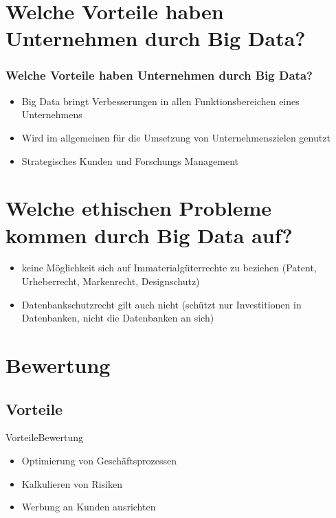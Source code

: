 \documentclass[10pt,a4paper]{beamer}
\begin{document}
\section{Welche Vorteile haben Unternehmen durch Big Data?}
\begin{frame}
\frametitle{Welche Vorteile haben Unternehmen durch Big Data?}
\begin{itemize}
	\item Big Data bringt Verbesserungen in allen Funktionsbereichen eines Unternehmens \pause
	\item Wird im allgemeinen für die Umsetzung von Unternehmenszielen genutzt \pause
	\item Strategisches Kunden und Forschungs Management
\end{itemize}
\end{frame}

\section{Welche ethischen Probleme kommen durch Big Data auf?}
\begin{frame}
\begin{itemize}
  \frametitle{Welche ethischen Probleme kommen durch Big Data auf?}		  
\frametitle{Welche ethischen Probleme kommen durch Big Data auf?}
\item keine Möglichkeit sich auf Immaterialgüterrechte zu beziehen (Patent, Urheberrecht, Markenrecht, Designschutz)\pause
\item Datenbankschutzrecht gilt auch nicht (schützt nur Investitionen in Datenbanken, nicht die Datenbanken an sich)
\end{itemize}
\end{frame}

\section{Bewertung}
\subsection{Vorteile}
\begin{frame}{Vorteile}{Bewertung}
\begin{itemize}
\item Optimierung von Geschäftsprozessen \pause
\item Kalkulieren von Risiken \pause
\item Werbung an Kunden ausrichten
\end{itemize}
\end{frame}
\end{document}
